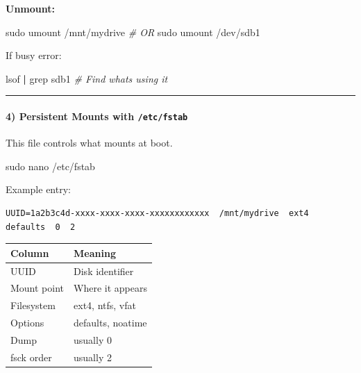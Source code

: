\documentclass[
  english,
  paper=a4,
  oneside  ,captions=tableheading
]{scrartcl}
\newenvironment{Shaded}{}{}
\newcommand{\CommentTok}[1]{\textcolor[rgb]{0.38,0.63,0.69}{\textit{#1}}}
\newcommand{\ExtensionTok}[1]{#1}
\newcommand{\FunctionTok}[1]{\textcolor[rgb]{0.02,0.16,0.49}{#1}}
\newcommand{\KeywordTok}[1]{\textcolor[rgb]{0.00,0.44,0.13}{\textbf{#1}}}
\newcommand{\NormalTok}[1]{#1}
\newcounter{none} %
\begin{document}
\textbf{Unmount:}

\begin{Shaded}
\begin{Highlighting}[]
\FunctionTok{sudo}\NormalTok{ umount /mnt/mydrive}
\CommentTok{\# OR}
\FunctionTok{sudo}\NormalTok{ umount /dev/sdb1}
\end{Highlighting}
\end{Shaded}

\faExclamationCircle If busy error:

\begin{Shaded}
\begin{Highlighting}[]
\ExtensionTok{lsof} \KeywordTok{|} \FunctionTok{grep}\NormalTok{ sdb1    }\CommentTok{\# Find what\textquotesingle{}s using it}
\end{Highlighting}
\end{Shaded}

\begin{center}\rule{0.5\linewidth}{0.5pt}\end{center}

\paragraph{\texorpdfstring{4) Persistent Mounts with
\texttt{/etc/fstab}}{4) Persistent Mounts with /etc/fstab}}\label{persistent-mounts-with-etcfstab}

This file controls what mounts at boot.

\begin{Shaded}
\begin{Highlighting}[]
\FunctionTok{sudo}\NormalTok{ nano /etc/fstab}
\end{Highlighting}
\end{Shaded}

Example entry:

\begin{verbatim}
UUID=1a2b3c4d-xxxx-xxxx-xxxx-xxxxxxxxxxxx  /mnt/mydrive  ext4  defaults  0  2
\end{verbatim}

{\def\LTcaptype{none} %
\begin{longtable}[]{@{}ll@{}}
\toprule\noalign{}
Column & Meaning \\
\midrule\noalign{}
\endhead
\bottomrule\noalign{}
\endlastfoot
UUID & Disk identifier \\
Mount point & Where it appears \\
Filesystem & ext4, ntfs, vfat \\
Options & defaults, noatime \\
Dump & usually 0 \\
fsck order & usually 2 \\
\end{longtable}
}
\end{document}
